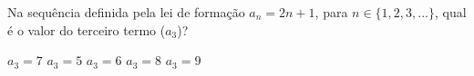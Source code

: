 Na sequência definida pela lei de formação $a_n = 2n + 1$, para $n \in \{1, 2, 3, ...\}$, qual é o valor do terceiro termo ($a_3$)?

$a_3=7$
$a_3=5$
$a_3=6$
$a_3=8$
$a_3=9$




